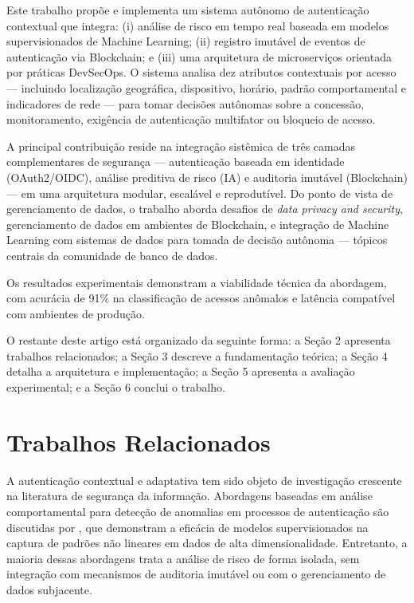 \documentclass[12pt]{article}
\begin{document}
Este trabalho propõe e implementa um sistema autônomo de autenticação contextual que integra: (i) análise de risco em tempo real baseada em modelos supervisionados de Machine Learning; (ii) registro imutável de eventos de autenticação via Blockchain; e (iii) uma arquitetura de microserviços orientada por práticas DevSecOps. O sistema analisa dez atributos contextuais por acesso --- incluindo localização geográfica, dispositivo, horário, padrão comportamental e indicadores de rede --- para tomar decisões autônomas sobre a concessão, monitoramento, exigência de autenticação multifator ou bloqueio de acesso.

A principal contribuição reside na integração sistêmica de três camadas complementares de segurança --- autenticação baseada em identidade (OAuth2/OIDC), análise preditiva de risco (IA) e auditoria imutável (Blockchain) --- em uma arquitetura modular, escalável e reprodutível. Do ponto de vista de gerenciamento de dados, o trabalho aborda desafios de \textit{data privacy and security}, gerenciamento de dados em ambientes de Blockchain, e integração de Machine Learning com sistemas de dados para tomada de decisão autônoma --- tópicos centrais da comunidade de banco de dados.

Os resultados experimentais demonstram a viabilidade técnica da abordagem, com acurácia de 91\% na classificação de acessos anômalos e latência compatível com ambientes de produção.

O restante deste artigo está organizado da seguinte forma: a Seção 2 apresenta trabalhos relacionados; a Seção 3 descreve a fundamentação teórica; a Seção 4 detalha a arquitetura e implementação; a Seção 5 apresenta a avaliação experimental; e a Seção 6 conclui o trabalho.

\section{Trabalhos Relacionados}

A autenticação contextual e adaptativa tem sido objeto de investigação crescente na literatura de segurança da informação. Abordagens baseadas em análise comportamental para detecção de anomalias em processos de autenticação são discutidas por \cite{goodfellow2016}, que demonstram a eficácia de modelos supervisionados na captura de padrões não lineares em dados de alta dimensionalidade. Entretanto, a maioria dessas abordagens trata a análise de risco de forma isolada, sem integração com mecanismos de auditoria imutável ou com o gerenciamento de dados subjacente.
\end{document}
